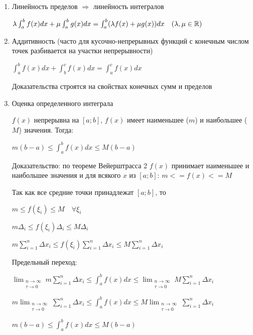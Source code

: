 \documentclass[12pt]{article}
\begin{document}
    \begin{enumerate}
        \item Линейность пределов $\Longrightarrow$ линейность интегралов

        $\lambda \int^b_a f(x)dx + \mu \int^b_a g(x)dx = \int^b_a (\lambda f(x) + \mu g(x)) dx \quad (\lambda, \mu \in \mathbb{R})$

        \item Аддитивность (часто для кусочно-непрерывных функций с конечным числом точек разбивается на участки непрерывности)

        $\int^b_a f(x)dx + \int^c_b f(x)dx = \int^c_a f(x)dx$

        Доказательства строятся на свойствах конечных сумм и пределов

        \item \hypertarget{integralevaluation}{Оценка определенного интеграла}

        $f(x)$ непрерывна на $[a; b]$, $f(x)$ имеет наименьшее ($m$) и наибольшее ($M$) значения. Тогда:

        $m (b-a) \leq \int^b_a f(x)dx \leq M(b - a)$

        \begin{MyProof}
            Доказательство: по теореме Вейерштрасса 2 $f(x)$ принимает наименьшее и наибольшее значения и для всякого $x$ из $[a; b]$:  $m <= f(x) <= M$

            Так как все средние точки принадлежат $[a; b]$, то

            $m \leq f(\xi_i) \leq M \quad \forall \xi_i$

            $m \Delta_i \leq f(\xi_i) \Delta_i \leq M \Delta_i$

            $m \sum_{i=1}^n \Delta x_i \leq f(\xi_i) \sum_{i=1}^n \Delta x_i \leq M \sum_{i=1}^n \Delta x_i$

            Предельный переход:

            $\lim_{\substack{n\to\infty \\ \tau\to0}} m \sum_{i=1}^n \Delta x_i \leq \int^b_a f(x) dx \leq \lim_{\substack{n\to\infty \\ \tau\to0}} M \sum_{i=1}^n \Delta x_i$

            $m \lim_{\substack{n\to\infty \\ \tau\to0}} \sum_{i=1}^n \Delta x_i \leq \int^b_a f(x) dx \leq M \lim_{\substack{n\to\infty \\ \tau\to0}} \sum_{i=1}^n \Delta x_i$

            $m (b - a) \leq \int^b_a f(x) dx \leq M (b - a)$


\end{MyProof}
\end{enumerate}
\end{document}
